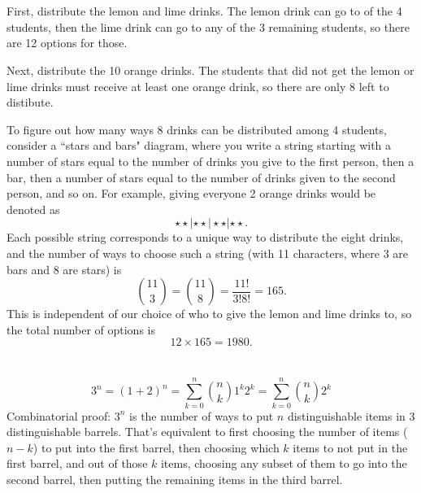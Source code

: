 \documentclass[12pt]{article}
\begin{document}
\section{}
\noindent{}\bigskip\par
First, distribute the lemon and lime drinks. The lemon drink can go to of the 4 students, then the lime drink can go to any of the 3 remaining students, so there are 12 options for those.
\par
Next, distribute the 10 orange drinks. The students that did not get the lemon or lime drinks must receive at least one orange drink, so there are only 8 left to distibute.
\par
To figure out how many ways 8 drinks can be distributed among 4 students, consider a ``stars and bars" diagram, where you write a string starting with a number of stars equal to the number of drinks you give to the first person, then a bar, then a number of stars equal to the number of drinks given to the second person, and so on. For example, giving everyone 2 orange drinks would be denoted as
\[ \star \star | \star \star | \star \star | \star \star. \]
Each possible string corresponds to a unique way to distribute the eight drinks, and the number of ways to choose such a string (with 11 characters, where 3 are bars and 8 are stars) is
\[ \binom{11}{3} = \binom{11}{8} = \frac{11!}{3!8!} = 165. \]
This is independent of our choice of who to give the lemon and lime drinks to, so the total number of options is
\[ 12 \times 165 = 1980. \]

\section{}
\noindent{}\bigskip\par

\[ 3^n= (1+2)^n=\sum_{k=0}^n \binom{n}{k} 1^k2^k = \sum_{k=0}^n \binom{n}{k} 2^k\]
Combinatorial proof: $3^n$ is the number of ways to put $n$ distinguishable items in 3 distinguishable barrels. That's equivalent to first choosing the number of items ($n-k$) to put into the first barrel, then choosing which $k$ items to not put in the first barrel, and out of those $k$ items, choosing any subset of them to go into the second barrel, then putting the remaining items in the third barrel.
\end{document}
